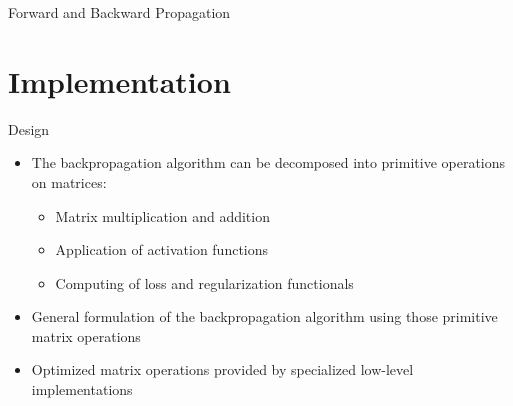 \documentclass{beamer}
\begin{document}
\begin{frame}{Forward and Backward Propagation}

\end{frame}
\section{Implementation}

\begin{frame}{Design}
  \begin{itemize}
    \item The backpropagation algorithm can be decomposed into primitive operations
      on matrices:
      \begin{itemize}
        \item Matrix multiplication and addition
        \item Application of activation functions
        \item Computing of loss and regularization functionals
        \end{itemize}
   \item General formulation of the backpropagation algorithm using
     those primitive matrix operations
   \item Optimized matrix operations provided by specialized low-level implementations
   \end{itemize}
 \end{frame}
\end{document}
